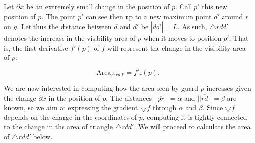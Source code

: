 Let $\partial x$ be an extremely small change in the position of $p$. Call $p'$ this new position of $p$. The point $p'$ can see then up to a new maximum point $d'$ around $r$ on $g$. Let thus the distance between $d$ and $d'$ be $|\overline{dd'}| = L$. As such, $\triangle rdd'$ denotes the increase in the visibility area of $p$ when it moves to position $p'$. That is, the first derivative $f'(p)$ of $f$ will represent the change in the visibility area of $p$:

\begin{equation}
    \text{Area}_{\triangle rdd'} = f'_r(p). \label{eq:derivative}
\end{equation}








We are now interested in computing how the area seen by guard $p$ increases given the change $\partial x$ in the position of $p$. The distances $||\overline{pr}|| = \alpha$ and $||\overline{rd}|| = \beta$ are known, so we aim at expressing the gradient $\bigtriangledown f$ through $\alpha$ and $\beta$. Since $\bigtriangledown f$ depends on the change in the coordinates of $p$, computing it is tightly connected to the change in the area of triangle $\triangle rdd'$. We will proceed to calculate the area of $\triangle rdd'$ below.

